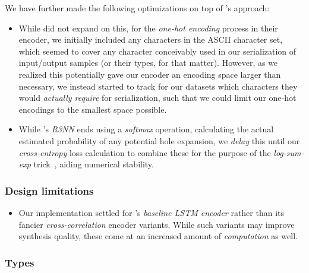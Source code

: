 \documentclass{article}
\begin{document}
We have further made the following optimizations on top of \citet{nsps}'s approach:
\begin{itemize}
    \item While \citet{nsps} did not expand on this,
    for the \emph{one-hot encoding} process in their encoder,
    we initially included any characters in the ASCII character set,
    which seemed to cover any character conceivably used in our serialization of input/output samples (or their types, for that matter).
    However, as we realized this potentially gave our encoder an encoding space larger than necessary,
    we instead started to track for our datasets which characters they would \emph{actually require} for serialization,
    such that we could limit our one-hot encodings to the smallest space possible.
    \item While \citet{nsps}'s \emph{R3NN} ends using a \emph{softmax} operation,
    calculating the actual estimated probability of any potential hole expansion,
    we \emph{delay} this until our \emph{cross-entropy} loss calculation to combine these for the purpose of the \emph{log-sum-exp} trick~\citep{eisele2016log},
    aiding numerical stability.
\end{itemize}

\subsubsection{Design limitations}

\begin{itemize}
    \item Our implementation settled for \cite{nsps}'s \emph{baseline LSTM encoder} rather than its fancier \emph{cross-correlation} encoder variants.
    While such variants may improve synthesis quality,
    these come at an increased amount of \emph{computation} as well.
\end{itemize}

\subsubsection{Types}

\end{document}
